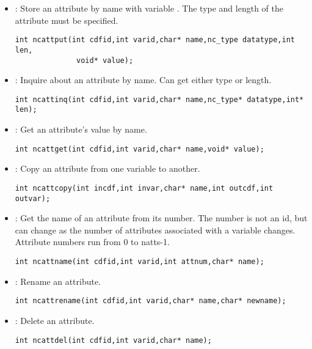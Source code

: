 \begin{itemize}

\item {} : Store an attribute by name with variable .
The type and 
length of the attribute must be specified.
\begin{verbatim}
int ncattput(int cdfid,int varid,char* name,nc_type datatype,int len,
              void* value);
\end{verbatim}

\item {} : Inquire about an attribute by name. Can get either
type or length. 
\begin{verbatim}
int ncattinq(int cdfid,int varid,char* name,nc_type* datatype,int* len);
\end{verbatim}

\item {} : Get an attribute's value by name. 
\begin{verbatim}
int ncattget(int cdfid,int varid,char* name,void* value);
\end{verbatim}

\item {} : Copy an attribute from one variable to another. 
\begin{verbatim}
int ncattcopy(int incdf,int invar,char* name,int outcdf,int outvar);
\end{verbatim}

\item {} : Get the name of an attribute from its number. The
number is not an id, 
but can change as the number of attributes associated with a variable
changes. Attribute numbers run from 0 to natts-1.
\begin{verbatim}
int ncattname(int cdfid,int varid,int attnum,char* name);
\end{verbatim}

\item {} : Rename an attribute. 
\begin{verbatim}
int ncattrename(int cdfid,int varid,char* name,char* newname);
\end{verbatim}

\item {} : Delete an attribute. 
\begin{verbatim}
int ncattdel(int cdfid,int varid,char* name);
\end{verbatim}

\end{itemize}

